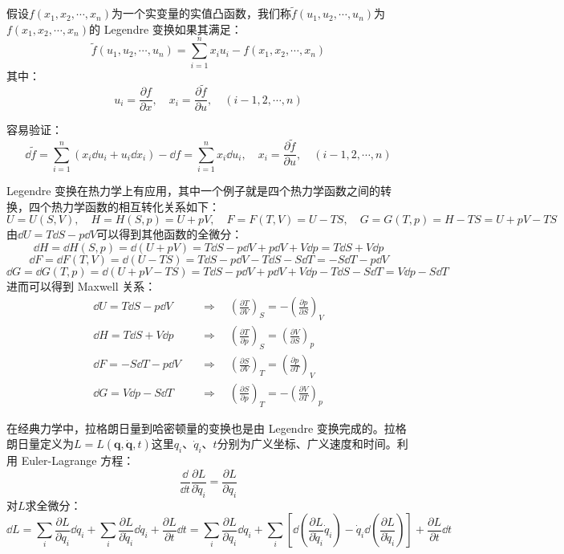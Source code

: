 \begin{definition}[$n$维 Legendre 变换]
假设$f(x_1,x_2,\cdots,x_n)$为一个实变量的实值凸函数，我们称$\tilde{f}(u_1,u_2,\cdots,u_n)$为$f(x_1,x_2,\cdots,x_n)$的 Legendre 变换如果其满足：
\[\tilde{f}(u_1,u_2,\cdots,u_n)=\sum_{i=1}^nx_iu_i-f(x_1,x_2,\cdots,x_n)\]
其中：
\[u_i=\frac{\partial f}{\partial x}, \quad x_i=\frac{\partial \tilde{f}}{\partial u}, \quad (i-1,2,\cdots,n)\]
\end{definition}
容易验证：
\[\dd{\tilde{f}}=\sum_{i=1}^n(x_i\dd{u_i}+u_i\dd{x_i})-\dd{f}=\sum_{i=1}^nx_i\dd{u_i}, \quad x_i=\frac{\partial \tilde{f}}{\partial u}, \quad (i-1,2,\cdots,n)\]

Legendre 变换在热力学上有应用，其中一个例子就是四个热力学函数之间的转换，四个热力学函数的相互转化关系如下：
\[U=U(S,V), \quad H=H(S,p)=U+pV, \quad F=F(T,V)=U-TS, \quad G=G(T,p)=H-TS=U+pV-TS\]
由$\dd{U}=T\dd{S}-p\dd{V}$可以得到其他函数的全微分：
\[\dd{H}=\dd{H}(S,p)=\dd(U+pV)=T\dd{S}-p\dd{V}+p\dd{V}+V\dd{p}=T\dd{S}+V\dd{p}\]
\[\dd{F}=\dd{F}(T,V)=\dd(U-TS)=T\dd{S}-p\dd{V}-T\dd{S}-S\dd{T}=-S\dd{T}-p\dd{V}\]
\[\dd{G}=\dd{G}(T,p)=\dd(U+pV-TS)=T\dd{S}-p\dd{V}+p\dd{V}+V\dd{p}-T\dd{S}-S\dd{T}=V\dd{p}-S\dd{T}\]
进而可以得到 Maxwell 关系：
\[\begin{aligned}
\dd{U}=T\dd{S}-p\dd{V} \quad &\Rightarrow \quad \left(\frac{\partial T}{\partial V}\right)_S=-\left(\frac{\partial p}{\partial S}\right)_V\\
\dd{H}=T\dd{S}+V\dd{p} \quad &\Rightarrow \quad \left(\frac{\partial T}{\partial p}\right)_S=\left(\frac{\partial V}{\partial S}\right)_p\\
\dd{F}=-S\dd{T}-p\dd{V} \quad &\Rightarrow \quad \left(\frac{\partial S}{\partial V}\right)_T=\left(\frac{\partial p}{\partial T}\right)_V\\
\dd{G}=V\dd{p}-S\dd{T} \quad &\Rightarrow \quad \left(\frac{\partial S}{\partial p}\right)_T=-\left(\frac{\partial V}{\partial T}\right)_p
\end{aligned}\]

在经典力学中，拉格朗日量到哈密顿量的变换也是由 Legendre 变换完成的。拉格朗日量定义为$L=L(\mathbf{q},\dot{\mathbf{q}},t)$这里$q_i$、$\dot{q}_i$、$t$分别为广义坐标、广义速度和时间。利用 Euler-Lagrange 方程：
\[\frac{\dd}{\dd t}\frac{\partial L}{\partial \dot{q}_i}=\frac{\partial L}{\partial q_i}\]
对$L$求全微分：
\[\dd{L}=\sum_i\frac{\partial L}{\partial q_i}\dd{q_i}+\sum_i\frac{\partial L}{\partial \dot{q}_i}\dd{\dot{q}_i}+\frac{\partial L}{\partial t}\dd{t}
=\sum_i\frac{\partial L}{\partial q_i}\dd{q_i}+\sum_i\left[\dd\left(\frac{\partial L}{\partial \dot{q}_i}\dot{q}_i\right)-\dot{q}_i\dd\left(\frac{\partial L}{\partial \dot{q}_i}\right)\right]+\frac{\partial L}{\partial t}\dd{t}\]


